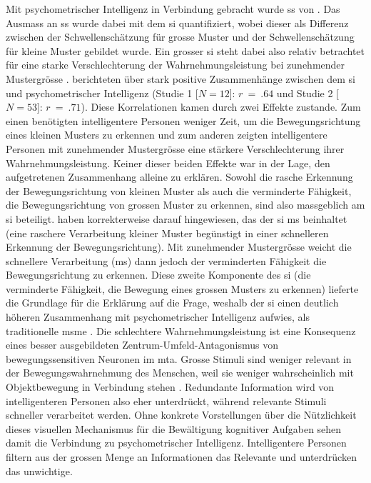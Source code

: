 \documentclass[11pt, twoside, a4paper]{book}		%
\begin{document}
Mit psychometrischer Intelligenz in Verbindung gebracht wurde \gls{ss} von \citet{Melnick2013}.
Das Ausmass an \gls{ss} wurde dabei mit dem \gls{si} quantifiziert, wobei dieser als Differenz zwischen der Schwellenschätzung für grosse Muster und der Schwellenschätzung für kleine Muster gebildet wurde. Ein grosser \gls{si} steht dabei also relativ betrachtet für eine starke Verschlechterung der Wahrnehmungsleistung bei zunehmender Mustergrösse \citep[einer stark ausgeprägten \gls{ss};][]{Tadin2006}. 
\citeauthor{Melnick2013} berichteten über stark positive Zusammenhänge zwischen dem \gls{si} und psychometrischer Intelligenz (Studie 1 [$N=12$]: $r~=~.64$ und Studie 2 [$N=53$]: $r~=~.71$). 
Diese Korrelationen kamen durch zwei Effekte zustande. Zum einen benötigten intelligentere Personen weniger Zeit, um die Bewegungsrichtung eines kleinen Musters zu erkennen und zum anderen zeigten intelligentere Personen mit zunehmender Mustergrösse eine stärkere Verschlechterung ihrer Wahrnehmungsleistung. Keiner dieser beiden Effekte war in der Lage, den aufgetretenen Zusammenhang alleine zu erklären. Sowohl die rasche Erkennung der Bewegungsrichtung von kleinen Muster als auch die verminderte Fähigkeit, die Bewegungsrichtung von grossen Muster zu erkennen, sind also massgeblich am \gls{si} beteiligt. 
\citeauthor{Melnick2013} haben korrekterweise darauf hingewiesen, das der \gls{si} \gls{ms} beinhaltet (eine raschere Verarbeitung kleiner Muster begünstigt in einer schnelleren Erkennung der Bewegungsrichtung). Mit zunehmender Mustergrösse weicht die schnellere Verarbeitung (\gls{ms}) dann jedoch der verminderten Fähigkeit die Bewegungsrichtung zu erkennen. Diese zweite Komponente des \gls{si} (die verminderte Fähigkeit, die Bewegung eines grossen Musters zu erkennen) lieferte die Grundlage für die Erklärung auf die Frage, weshalb der \gls{si} einen deutlich höheren Zusammenhang mit psychometrischer Intelligenz aufwies, als traditionelle \gls{msm}e \citep[$r~=~-.20$ bis $r~=~-.40$; siehe][]{Sheppard2008}. Die schlechtere Wahrnehmungsleistung ist eine Konsequenz eines besser ausgebildeten Zentrum-Umfeld-Antagonismus von bewegungssensitiven Neuronen im \gls{mta}. Grosse Stimuli sind weniger relevant in der Bewegungswahrnehmung des Menschen, weil sie weniger wahrscheinlich mit Objektbewegung in Verbindung stehen  \citep[S. SEITENZAHL?]{Regan2000}. Redundante Information wird von intelligenteren Personen also eher unterdrückt, während relevante Stimuli schneller verarbeitet werden. Ohne konkrete Vorstellungen über die Nützlichkeit dieses visuellen Mechanismus für die Bewältigung kognitiver Aufgaben sehen \citeauthor{Melnick2013} damit die Verbindung zu psychometrischer Intelligenz. Intelligentere Personen filtern aus der grossen Menge an Informationen das Relevante und unterdrücken das unwichtige.
\end{document}
